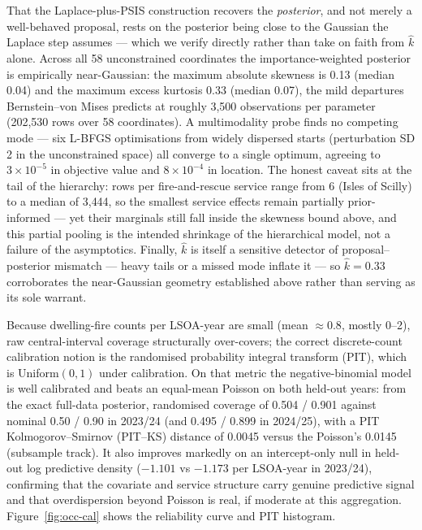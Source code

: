 That the Laplace-plus-PSIS construction recovers the \emph{posterior}, and not
merely a well-behaved proposal, rests on the posterior being close to the Gaussian
the Laplace step assumes --- which we verify directly rather than take on faith from
$\hat{k}$ alone. Across all 58 unconstrained coordinates the importance-weighted
posterior is empirically near-Gaussian: the maximum absolute skewness is 0.13
(median 0.04) and the maximum excess kurtosis 0.33 (median 0.07), the mild
departures Bernstein--von Mises predicts at roughly 3{,}500 observations per
parameter (202{,}530 rows over 58 coordinates). A multimodality probe finds no
competing mode --- six L-BFGS optimisations from widely dispersed starts
(perturbation SD 2 in the unconstrained space) all converge to a single optimum,
agreeing to $3\times10^{-5}$ in objective value and $8\times10^{-4}$ in location.
The honest caveat sits at the tail of the hierarchy: rows per fire-and-rescue
service range from 6 (Isles of Scilly) to a median of 3{,}444, so the smallest
service effects remain partially prior-informed --- yet their marginals still fall
inside the skewness bound above, and this partial pooling is the intended shrinkage
of the hierarchical model, not a failure of the asymptotics. Finally, $\hat{k}$ is
itself a sensitive detector of proposal--posterior mismatch --- heavy tails or a
missed mode inflate it --- so $\hat{k}=0.33$ corroborates the near-Gaussian geometry
established above rather than serving as its sole warrant.

Because dwelling-fire counts per LSOA-year are small (mean $\approx0.8$, mostly
0--2), raw central-interval coverage structurally over-covers; the correct
discrete-count calibration notion is the randomised probability integral
transform (PIT), which is Uniform$(0,1)$ under calibration. On that metric the
negative-binomial model is well calibrated and beats an equal-mean Poisson on both
held-out years: from the exact full-data posterior, randomised coverage of
0.504 / 0.901 against nominal 0.50 / 0.90 in
2023/24 (and 0.495 / 0.899 in 2024/25), with a PIT Kolmogorov--Smirnov (PIT--KS)
distance of 0.0045 versus the Poisson's 0.0145 (subsample track). It also improves markedly on an
intercept-only null in held-out
log predictive density ($-1.101$ vs $-1.173$ per LSOA-year in 2023/24), confirming
that the covariate and service structure carry genuine predictive signal and that
overdispersion beyond Poisson is real, if moderate at this aggregation.
Figure~\ref{fig:occ-cal} shows the reliability curve and PIT histogram.

